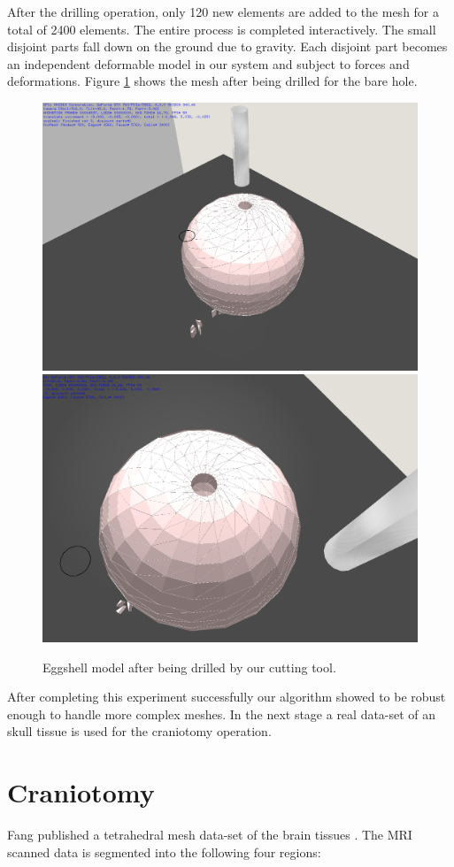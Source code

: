 After the drilling operation, only 120 new elements are added to the mesh for a total of 2400 elements. The entire process is completed 
interactively. The small disjoint parts fall down on the ground due to gravity. Each disjoint part becomes an independent
deformable model in our system and subject to forces and deformations. Figure \ref{fig:eggshell02} shows the mesh after being 
drilled for the bare hole.


\begin{figure}[H]
  \centering
  \includegraphics[width=0.6\linewidth]{figures/evaluation/eggshell02.png}
  \includegraphics[width=0.6\linewidth]{figures/evaluation/eggshell03.png}
  \caption{\label{fig:eggshell02}
  {Eggshell model after being drilled by our cutting tool.}
}
\end{figure}

After completing this experiment successfully our algorithm showed to be robust enough to handle 
more complex meshes. In the next stage a real data-set of an skull tissue is used for the craniotomy operation.

\section{Craniotomy}
Fang \etal published a tetrahedral mesh data-set of the brain tissues \cite{fang2010mesh}. The MRI scanned data is 
segmented into the following four regions:

